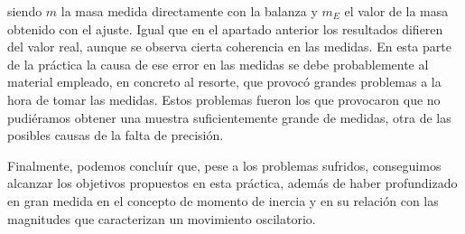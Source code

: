 \documentclass[a4paper,12pt,titlepage]{article}
\begin{document}
siendo $m$ la masa medida directamente con la balanza y $m_E$ el valor de la masa obtenido con el ajuste. Igual que en el apartado anterior los resultados difieren del valor real, aunque se observa cierta coherencia en las medidas. En esta parte de la práctica la causa de ese error en las medidas se debe probablemente al material empleado, en concreto al resorte, que provocó grandes problemas a la hora de tomar las medidas. Estos problemas fueron los que provocaron que no pudiéramos obtener una muestra suficientemente grande de medidas, otra de las posibles causas de la falta de precisión.

\par Finalmente, podemos concluír que, pese a los problemas sufridos, conseguimos alcanzar los objetivos propuestos en esta práctica, además de haber profundizado en gran medida en el concepto de momento de inercia y en su relación con las magnitudes que caracterizan un movimiento oscilatorio.
\end{document}
